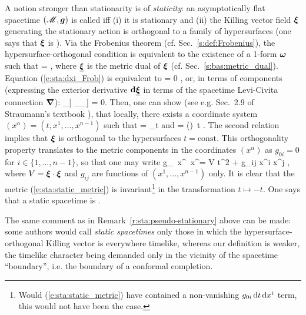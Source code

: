 A notion stronger than stationarity is of \emph{staticity}: an asymptotically
flat spacetime $(\mathscr{M},\bm{g})$ is called 
iff (i) it is stationary and (ii) the Killing vector field $\bm{\xi}$
generating the stationary action is orthogonal to a family of hypersurfaces
(one says that $\bm{\xi}$ is ).
Via the Frobenius theorem (cf. Sec.~\ref{s:def:Frobenius}), the hypersurface-orthogonal
condition is equivalent to the existence of a 1-form $\bm{\omega}$ such that
\be \label{e:sta:dxi_Frob}
    \dd \uu{\xi} = \w{\omega} \wedge \uu{\xi} ,
\ee
where $\underline{\bm{\xi}}$ is the metric dual of $\bm{\xi}$ (cf. Sec.~\ref{s:bas:metric_dual}).
Equation (\ref{e:sta:dxi_Frob}) is equivalent to
\be
    \uu{\xi}\wedge\dd\uu{\xi} = 0 ,
\ee
or, in terms of components (expressing the exterior derivative $\mathbf{d}\underline{\bm{\xi}}$ in
terms of the spacetime Levi-Civita connection $\bm{\nabla}$):
\be
    \xi_{[\alpha} \nabla_\beta \xi_{\gamma]} = 0.
\ee
Then, one can show (see e.g. Sec.~2.9 of Straumann's textbook \cite{Strau13}), that locally, there exists a coordinate system $(x^\alpha)=(t,x^1,\ldots,x^{n-1})$ such that
\be \label{e:sta:xi_wpar_t}
    \w{\xi} = \wpar_t \qquad\mbox{and}\qquad \uu{\xi} = (\w{\xi}\cdot\w{\xi})\, \dd t .
\ee
The second relation implies that $\bm{\xi}$ is orthogonal to the hypersurfaces $t=\mathrm{const}$. This orthogonality property translates to the metric components in the coordinates
$(x^\alpha)$ as $g_{0i}=0$ for $i\in\{1,\ldots,n-1\}$, so that one may write
\be \label{e:sta:static_metric}
    g_{\mu\nu}\, \D x^\mu \, \D x^\nu = V \D t^2 + g_{ij} \D x^i \D x^j ,
\ee
where $V=\bm{\xi}\cdot\bm{\xi}$ and $g_{ij}$ are functions of $(x^1,\ldots,x^{n-1})$ only.
It is clear that the metric (\ref{e:sta:static_metric}) is invariant\footnote{Would
(\ref{e:sta:static_metric}) have contained a non-vanishing $g_{0i}\, \mathrm{d} t \, \mathrm{d} x^i$ term,
this would not have been the case.} in the
transformation $t\mapsto-t$. One says that a static spacetime is
.

\begin{remark}
The same comment as in Remark~\ref{r:sta:pseudo-stationary} above can be made: some authors
would call \emph{static spacetimes} only those in which the hypersurface-orthogonal Killing vector
is everywhere timelike, whereas our definition is weaker, the timelike character being demanded only in the vicinity of the spacetime ``boundary'', i.e. the boundary of a conformal completion.
\end{remark}

